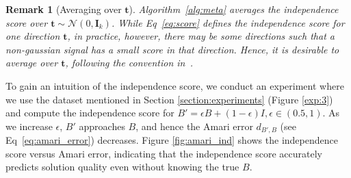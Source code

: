 \documentclass[letterpaper]{article}
\newtheorem{remark}{Remark}
\newcommand{\bt}{\pmb{t}}
\newcommand{\rd}{\color{red}}
\newcommand{\bk}{\color{black}}
\newcommand{\bb}[1]{\left(#1\right)}
\newcommand{\bbb}[1]{\left[#1\right]}
\DeclareMathOperator*{\argmin}{arg\,min}
\begin{document}
\begin{remark}[Averaging over $\bt$]\label{remark:average_t}
Algorithm~\ref{alg:meta} averages the independence score over $\bt\sim \mathcal{N}\bb{0,\bm{I}_{k}}$. While Eq~\ref{eq:score} defines the independence score for one direction $\bt$, in practice, however, there may be some directions such that a non-gaussian signal has a small score in that direction. Hence, it is desirable to average over $\bt$, following the convention in~\cite{chen2005ICA,ERIKSSON20032195,HENZE19971}.
\end{remark}
To gain an intuition of the independence score, we conduct an experiment where we use the dataset mentioned in Section \ref{section:experiments} (Figure \ref{exp:3}) and compute the independence score for $B' = \epsilon B + \bb{1-\epsilon}I, \epsilon \in \bb{0.5, 1}$. As we increase $\epsilon$, $B'$ approaches $B$, and hence the Amari error $d_{B', B}$ (see Eq~\ref{eq:amari_error}) decreases. Figure \ref{fig:amari_ind} shows the independence score versus Amari error, indicating that the independence score accurately predicts solution quality even without knowing the true $B$.
%
\end{document}
